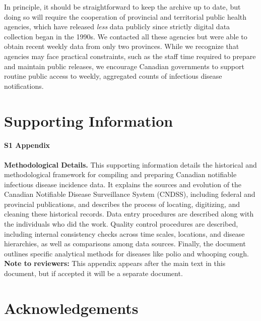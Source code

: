 \documentclass[12pt]{article}
\begin{document}
In principle, it should be straightforward to keep the archive up to date, but doing so will require the cooperation of provincial and territorial public health agencies, which have released \emph{less} data publicly since strictly digital data collection began in the 1990s. We contacted all these agencies but were able to obtain recent weekly data from only two provinces. While we recognize that agencies may face practical constraints, such as the staff time required to prepare and maintain public releases, we encourage Canadian governments to support routine public access to weekly, aggregated counts of infectious disease notifications.

\section{Supporting Information}

\paragraph*{S1 Appendix}\label{S1_Appendix}
{\bf Methodological Details.} This supporting information details the historical and methodological framework for compiling and preparing Canadian notifiable infectious disease incidence data. It explains the sources and evolution of the Canadian Notifiable Disease Surveillance System (CNDSS), including federal and provincial publications, and describes the process of locating, digitizing, and cleaning these historical records. Data entry procedures are described along with the individuals who did the work. Quality control procedures are described, including internal consistency checks across time scales, locations, and disease hierarchies, as well as comparisons among data sources. Finally, the document outlines specific analytical methods for diseases like polio and whooping cough. {\bf Note to reviewers:} This appendix appears after the main text in this document, but if accepted it will be a separate document.


\section*{Acknowledgements}
\end{document}
